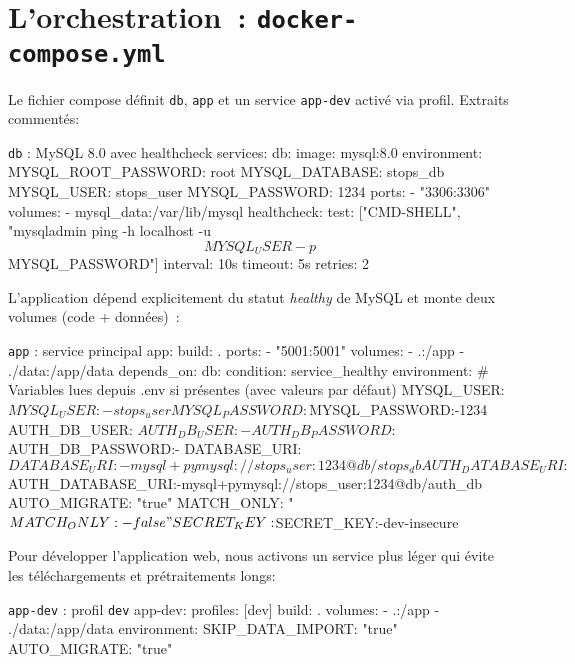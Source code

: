 \section{L'orchestration : \texttt{docker-compose.yml}}

Le fichier compose définit \texttt{db}, \texttt{app} et un service \texttt{app-dev} activé via profil. Extraits commentés:

\begin{codebox}{\texttt{db} : MySQL 8.0 avec healthcheck}
services:
  db:
    image: mysql:8.0
    environment:
      MYSQL_ROOT_PASSWORD: root
      MYSQL_DATABASE: stops_db
      MYSQL_USER: stops_user
      MYSQL_PASSWORD: 1234
    ports:
      - "3306:3306"
    volumes:
      - mysql_data:/var/lib/mysql
    healthcheck:
      test: ["CMD-SHELL", "mysqladmin ping -h localhost -u$${MYSQL_USER} -p$${MYSQL_PASSWORD}"]
      interval: 10s
      timeout: 5s
      retries: 2
\end{codebox}

\noindent L'application dépend explicitement du statut \textit{healthy} de MySQL et monte deux volumes (code + données) :

\begin{codebox}{\texttt{app} : service principal}
  app:
    build: .
    ports:
      - "5001:5001"
    volumes:
      - .:/app
      - ./data:/app/data
    depends_on:
      db:
        condition: service_healthy
    environment:
      # Variables lues depuis .env si présentes (avec valeurs par défaut)
      MYSQL_USER: ${MYSQL_USER:-stops_user}
      MYSQL_PASSWORD: ${MYSQL_PASSWORD:-1234}
      AUTH_DB_USER: ${AUTH_DB_USER:-}
      AUTH_DB_PASSWORD: ${AUTH_DB_PASSWORD:-}
      DATABASE_URI: ${DATABASE_URI:-mysql+pymysql://stops_user:1234@db/stops_db}
      AUTH_DATABASE_URI: ${AUTH_DATABASE_URI:-mysql+pymysql://stops_user:1234@db/auth_db}
      AUTO_MIGRATE: "true"
      MATCH_ONLY: "${MATCH_ONLY:-false}"
      SECRET_KEY: ${SECRET_KEY:-dev-insecure}
\end{codebox}

\noindent Pour développer l'application web, nous activons un service plus léger qui évite les téléchargements et prétraitements longs:

\begin{codebox}{\texttt{app-dev} : profil \texttt{dev}}
  app-dev:
    profiles: [dev]
    build: .
    volumes:
      - .:/app
      - ./data:/app/data
    environment:
      SKIP_DATA_IMPORT: "true"
      AUTO_MIGRATE: "true"
\end{codebox}

